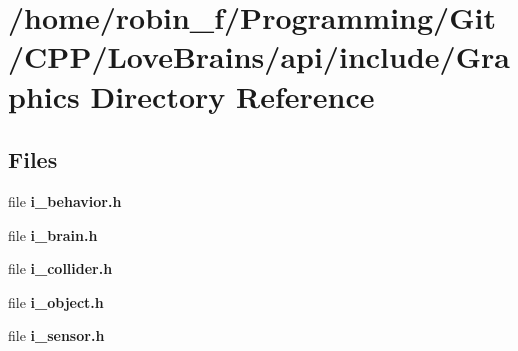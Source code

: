 \section{/home/robin\+\_\+f/\+Programming/\+Git/\+C\+P\+P/\+Love\+Brains/api/include/\+Graphics Directory Reference}
\label{dir_fdf2349a8a5ecc5dbdd5c700e899d82b}
\subsection*{Files}
\begin{DoxyCompactItemize}
\item 
file {\bfseries i\+\_\+behavior.\+h}
\item 
file {\bfseries i\+\_\+brain.\+h}
\item 
file {\bfseries i\+\_\+collider.\+h}
\item 
file {\bfseries i\+\_\+object.\+h}
\item 
file {\bfseries i\+\_\+sensor.\+h}
\end{DoxyCompactItemize}
